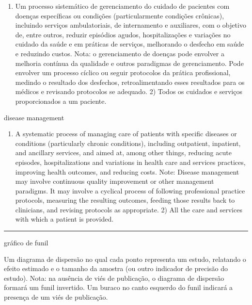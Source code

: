 \documentclass[
]{book}
\providecommand{\tightlist}{%
  \setlength{\itemsep}{0pt}\setlength{\parskip}{0pt}}
\begin{document}
\begin{enumerate}
\def\labelenumi{\arabic{enumi})}
\tightlist
\item
  Um processo sistemático de gerenciamento do cuidado de pacientes com doenças específicas ou condições (particularmente condições crônicas), incluindo serviços ambulatoriais, de internamento e auxiliares, com o objetivo de, entre outros, reduzir episódios agudos, hospitalizações e variações no cuidado da saúde e em práticas de serviços, melhorando o desfecho em saúde e reduzindo custos. Nota: o gerenciamento de doenças pode envolver a melhoria contínua da qualidade e outros paradigmas de gerenciamento. Pode envolver um processo cíclico ou seguir protocolos da prática profissional, medindo o resultado dos desfechos, retroalimentando esses resultados para os médicos e revisando protocolos se adequado. 2) Todos os cuidados e serviços proporcionados a um paciente.
\end{enumerate}

disease management

\begin{enumerate}
\def\labelenumi{\arabic{enumi})}
\tightlist
\item
  A systematic process of managing care of patients with specific diseases or conditions (particularly chronic conditions), including outpatient, inpatient, and ancillary services, and aimed at, among other things, reducing acute episodes, hospitalizations and variations in health care and services practices, improving health outcomes, and reducing costs. Note: Disease management may involve continuous quality improvement or other management paradigms. It may involve a cyclical process of following professional practice protocols, measuring the resulting outcomes, feeding those results back to clinicians, and revising protocols as appropriate. 2) All the care and services with which a patient is provided.
\end{enumerate}

\begin{center}\rule{0.5\linewidth}{0.5pt}\end{center}

gráfico de funil

Um diagrama de dispersão no qual cada ponto representa um estudo, relatando o efeito estimado e o tamanho da amostra (ou outro indicador de precisão do estudo). Nota: na ausência de viés de publicação, o diagrama de dispersão formará um funil invertido. Um buraco no canto esquerdo do funil indicará a presença de um viés de publicação.
\end{document}
